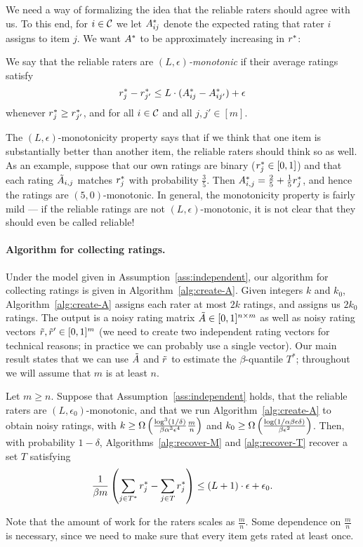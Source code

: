 We need a way of formalizing the idea that the reliable raters should 
agree with us. To this end, for $i \in \mathcal{C}$ we let $A^*_{ij}$ denote 
the expected rating that rater $i$ assigns to item $j$.
We want $A^*$ to be approximately increasing in $r^*$:
\begin{definition}
\label{def:lipschitz}
We say that the reliable raters are \emph{$(L,\epsilon)$-monotonic} if their 
average ratings satisfy
\begin{equation}
\label{eq:lipschitz}
r^*_j - r^*_{j'} \leq L \cdot (A^*_{ij} - A^*_{ij'}) + \epsilon
\end{equation}
whenever $r^*_j \geq r^*_{j'}$, and
for all $i \in \mathcal{C}$ and all $j,j' \in [m]$.
\end{definition}
The $(L,\epsilon)$-monotonicity property says that if we think that one item is 
substantially better than another item, the reliable raters should think 
so as well. As an example, suppose that our own ratings are binary 
($r^*_j \in [0,1]$) and that each rating $\tilde{A}_{i,j}$ matches $r^*_j$ 
with probability $\frac{3}{5}$. Then 
$A^*_{i,j} = \frac{2}{5} + \frac{1}{5}r^*_j$, 
and hence the ratings are $(5,0)$-monotonic. 
In general, the monotonicity property is fairly mild --- if the reliable ratings 
are not $(L,\epsilon)$-monotonic, it is not clear that they should 
even be called reliable!

\paragraph{Algorithm for collecting ratings.}
Under the model given in Assumption~\ref{ass:independent}, 
our algorithm for collecting ratings is given in 
Algorithm~\ref{alg:create-A}. Given integers $k$ and $k_0$, 
Algorithm~\ref{alg:create-A} assigns each rater at most $2k$ 
ratings, and assigns us $2k_0$ ratings. The output is a 
noisy rating matrix $\tilde{A} \in [0,1]^{n \times m}$ as well 
as noisy rating vectors $\tilde{r}, \tilde{r}' \in [0,1]^m$ (we need 
to create two independent rating vectors for technical reasons; 
in practice we can probably use a single vector).
Our main result states that we can use $\tilde{A}$ and $\tilde{r}$ to 
estimate the $\beta$-quantile $T^*$; throughout we will assume 
that $m$ is at least $n$.
\begin{theorem}
\label{thm:main}
Let $m \geq n$. 
Suppose that Assumption~\ref{ass:independent} holds, that 
the reliable raters are $(L,\epsilon_0)$-monotonic, and 
that we run Algorithm~\ref{alg:create-A} to obtain noisy ratings, 
with $k \geq \Omega\left( \frac{\log^3(1/\delta)}{\beta\alpha^3\epsilon^4}\frac{m}{n} \right)$ and
$k_0 \geq \Omega\left( \frac{\log(1/\alpha\beta\epsilon\delta)}{\beta\epsilon^2} \right)$.
Then, with probability $1-\delta$, 
Algorithms~\ref{alg:recover-M} and \ref{alg:recover-T} recover a set $T$ satisfying 
\[ \frac{1}{\beta m} \left( \sum_{j \in T^*} r^*_j - \sum_{j \in T} r^*_j \right) 
\leq (L+1) \cdot \epsilon + \epsilon_0. \]
\end{theorem}
Note that the amount of work for the raters scales as $\frac{m}{n}$. Some dependence 
on $\frac{m}{n}$ is necessary, since we need to make sure that every item gets rated at least once.

